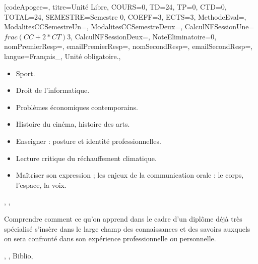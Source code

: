 

\module[codeApogee={},
titre={Unité Libre},
COURS={0},
TD={24},
TP={0},
CTD={0},
TOTAL={24},
SEMESTRE={Semestre 0},
COEFF={3},
ECTS={3},
MethodeEval={},
ModalitesCCSemestreUn={},
ModalitesCCSemestreDeux={},
CalculNFSessionUne={$frac{(CC+2*CT)}{3}$},
CalculNFSessionDeux={},
NoteEliminatoire={0},
nomPremierResp={},
emailPremierResp={},
nomSecondResp={},
emailSecondResp={},
langue={Français_},
{Unité obligatoire.},
{\begin{itemize}
L'unité Libre est à choisir, en début du semestre, parmi la centaine d'enseignements dédiés à cet usage et offerts par toutes
les composantes de l'université (Sciences, Droit-Economie-Gestion, Sport).\
Voici quelques exemples d'unités Libres,:

  \item Sport.
  \item Droit de l'informatique.
  \item Problèmes économiques contemporains.
  \item Histoire du cinéma, histoire des arts.
  \item Enseigner : posture et identité professionnelles.
  \item Lecture critique du réchauffement climatique.
  \item Maîtriser son expression ; les enjeux de la communication orale : le corps, l'espace, la voix.
\end{itemize}},
{},
{\begin{itemize}
\ObjItem Comprendre comment ce qu'on apprend dans le cadre d'un diplôme déjà très spécialisé s'insère dans le large champ des connaissances
 et des savoirs auxquels on sera confronté dans son expérience professionnelle ou personnelle.
\end{itemize}},
{},
{Biblio},

\vfill


